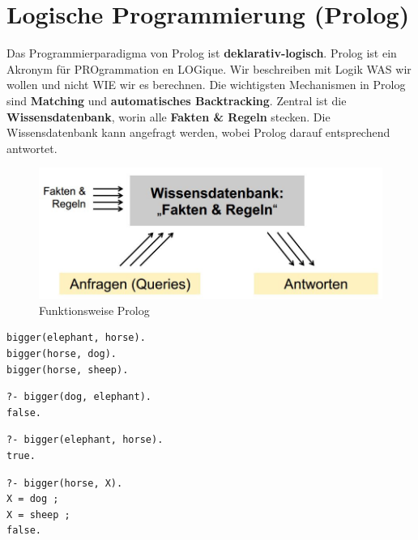 \chapter{Logische Programmierung (Prolog)}
Das Programmierparadigma von Prolog ist \textbf{deklarativ-logisch}. Prolog ist ein Akronym für PROgrammation en LOGique. Wir beschreiben mit Logik WAS wir wollen und nicht WIE wir es berechnen. Die wichtigsten Mechanismen in Prolog sind \textbf{Matching} und \textbf{automatisches Backtracking}. Zentral ist die \textbf{Wissensdatenbank}, worin alle \textbf{Fakten \& Regeln} stecken. Die Wissensdatenbank kann angefragt werden, wobei Prolog darauf entsprechend antwortet.

\begin{figure}[h!]
\centering
\includegraphics[width=0.7\linewidth]{fig/prolog-funktionsweise}
\caption{Funktionsweise Prolog}
\label{fig:funktionsweise-prolog}
\end{figure}

\begin{lstlisting}[caption=Wissensdatebank mit nur Fakten]
% In folgender Wissensdatenbank sind drei Fakten enthalten. Bigger definiert, dass das erste Elemente grösser als das zweite Element ist.
bigger(elephant, horse).
bigger(horse, dog).
bigger(horse, sheep).
\end{lstlisting}

\begin{lstlisting}[caption=Anfrage 1]
% Gegen die Wissensdatenbank kann eine Anfrage gemacht werden. Prolog prüft ob es für die Anfrage einen Match gibt. Jedoch existiert aber keine Match dafür. Nirgends ist definiert, dass ein Hund grösser als ein Elefant ist.
?- bigger(dog, elephant).
false.
\end{lstlisting}

\begin{lstlisting}[caption=Anfrage 2]
% Für folgende Anfrage ist ein Match vorhanden. Fakt 1 in der Wissensdatenbank matcht die Anfrage.
?- bigger(elephant, horse).
true.
\end{lstlisting}

\newpage
\begin{lstlisting}[caption=Anfrage mit Variable]
% Bei Anfragen können auch Variabeln definiert werden. Alle gross geschriebenen Wörter sind Variabeln. Prolog sucht nun nach allen Matches, welche als erstes Element horse haben. Als Resultat werden alle möglichen X Werte geliefert. (Prolog liefert immer nur ein Resultat - möchte man weitere Resultate ansehen, muss Semikolon gedrückt und um die Abfrage zu beenden den Punkt Operator wählen.)
?- bigger(horse, X).
X = dog ;
X = sheep ;
false.
\end{lstlisting}

